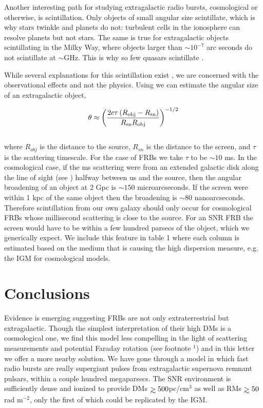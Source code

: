 \documentclass[useAMS,usenatbib]{mn2e}
\def\gtrsim{\mathrel{\hbox{\rlap{\hbox{\lower4pt\hbox{$\sim$}}}\hbox{$>$}}}}
\begin{document}
Another interesting path for studying extragalactic radio bursts, 
cosmological or otherwise, is scintillation. Only objects of small angular
size scintillate, which is why stars twinkle and planets do not: turbulent cells
in the ionosphere can resolve planets but not stars. The same is true for extragalactic
objects scintillating in the Milky Way, where objects larger than $\sim10^{-7}$ 
arc seconds do not scintillate at $\sim$GHz. 
This is why so few quasars scintillate \citep{2002Natur.415...57D}. 

While several explanations for this scintillation exist 
\citep{1992RSPTA.341..151N, 2014MNRAS.442.3338P}, we are  
concerned with the observational effects and not the physics. 
Using \cite{1986isra.book.....T} 
we can estimate the angular size of an extragalactic object,

\begin{equation}
\label{eqn-scint}
\theta \approx \left ( \frac{2 c \tau \, (R_{\rm obj} - R_{\rm sn})}{R_{\rm sn}R_{\rm obj}} \right )^{-1/2}
\end{equation}
\\

\noindent where $R_{obj}$ is the distance to the source, $R_{sn}$ is the distance 
to the screen, and $\tau$ is the scattering timescale. For the case of FRBs we 
take $\tau$ to be $\sim10$ ms. In the cosmological case, if the ms scattering
were from an extended galactic disk along the line of sight  (see \citet{2014ApJ...780L..33M})
halfway between
us and the source, then the angular broadening
of an object at 2 Gpc is $\sim150$ microarcseconds. If the screen were within 
1 kpc of the same object then the broadening is $\sim80$ nanoarcseconds. 
Therefore scintillation from our own galaxy should only occur for cosmological 
FRBs whose millisecond scattering is close to the source. For an SNR FRB the 
screen would have to be within a few hundred parsecs of the object, which we 
generically expect. We include this feature in table 1 where each 
column is estimated based on the medium that is causing the high dispersion measure, 
e.g. the IGM for cosmological models.


\section{Conclusions}
Evidence is emerging suggesting FRBs are not only extraterrestrial
but extragalactic. Though the simplest interpretation of their high DMs 
is a cosmological one, we find this model less compelling in the light of 
scattering measurements and potential Faraday rotation (see footnote $^1$)
and in this letter we offer a 
more nearby solution. 
We have gone through
a model in which fast radio bursts are really supergiant pulses from 
extragalactic supernova remnant pulsars, within a couple hundred megaparsecs. 
The SNR environment is sufficiently
dense and ionized to provide DMs $\gtrsim 500$pc/cm$^3$ as well as 
RMs $\gtrsim 50$ rad m$^{-2}$, only the first of which could be replicated by the IGM. 
\end{document}
